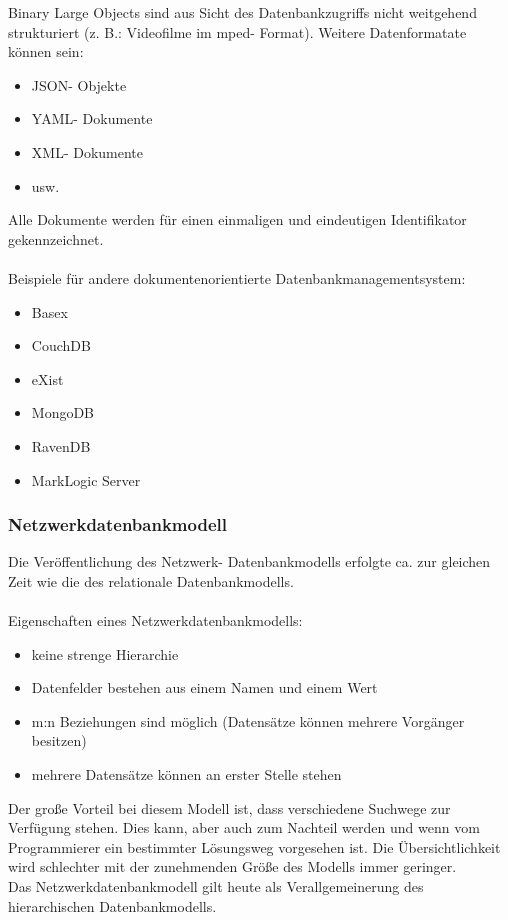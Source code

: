 \documentclass[12pt,a4paper]{report}
\begin{document}
\begin{onehalfspace}
Binary Large Objects sind aus Sicht des Datenbankzugriffs nicht weitgehend strukturiert (z. B.: Videofilme im mped- Format). Weitere Datenformatate können sein:
\begin{itemize}
\item JSON- Objekte
\item YAML- Dokumente
\item XML- Dokumente
\item usw.
\end{itemize}
Alle Dokumente werden für einen einmaligen und eindeutigen Identifikator gekennzeichnet.\\
\\Beispiele für andere dokumentenorientierte Datenbankmanagementsystem:
\begin{itemize}
\item Basex
\item CouchDB
\item eXist
\item MongoDB
\item RavenDB
\item MarkLogic Server
\end{itemize}

\subsubsection{Netzwerkdatenbankmodell}
Die Veröffentlichung des Netzwerk- Datenbankmodells erfolgte ca. zur gleichen Zeit wie die des relationale Datenbankmodells.\\
\\Eigenschaften eines Netzwerkdatenbankmodells:
\begin{itemize}
\item keine strenge Hierarchie
\item Datenfelder bestehen aus einem Namen und einem Wert
\item m:n Beziehungen sind möglich (Datensätze können mehrere Vorgänger besitzen)
\item mehrere Datensätze können an erster Stelle stehen
\end{itemize}
Der große Vorteil bei diesem Modell ist, dass verschiedene Suchwege zur Verfügung stehen. Dies kann, aber auch zum Nachteil werden und wenn vom Programmierer ein bestimmter Lösungsweg vorgesehen ist. Die Übersichtlichkeit wird schlechter mit der zunehmenden Größe des Modells immer geringer.\\

Das Netzwerkdatenbankmodell gilt heute als Verallgemeinerung des hierarchischen Datenbankmodells.


\end{onehalfspace}
\end{document}
